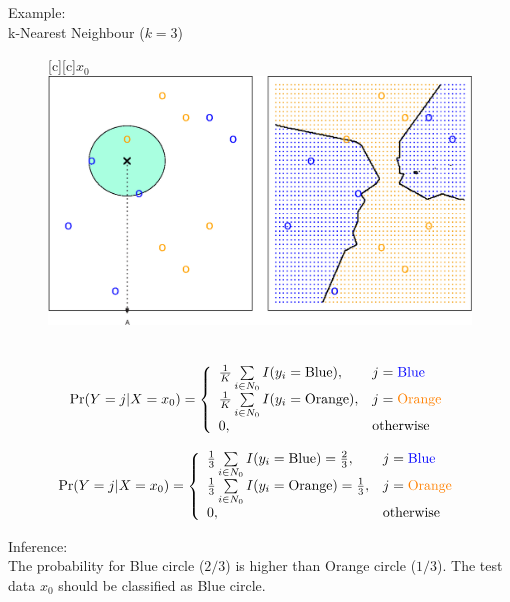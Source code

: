\documentclass[12pt,a4paper]{article}%
\theoremstyle{definition}
\theoremstyle{plain}
\numberwithin{equation}{section}
\begin{document}
\begin{framed}
Example: \\
k-Nearest Neighbour ($k=3$)

\begin{figure}[H]
\centering
{}[c][c]{$x_{0}$}
\includegraphics[scale=0.5]{images//2_14.eps}
\\~\\
\end{figure}

\begin{gather}
{\rm Pr}(Y=j|X=x_{0}) = \left\{
\begin{array}{ll}
\frac{1}{K}\sum\limits_{i \in N_{0}}I(y_{i}=\mbox{Blue}), & j = \mbox{\color{blue}Blue}\\
\frac{1}{K}\sum\limits_{i \in N_{0}}I(y_{i}=\mbox{Orange}), & j = \mbox{\color{orange}Orange}\\
0, & \mbox{otherwise}
\end{array} \right.
\end{gather}

\begin{gather}
{\rm Pr}(Y=j|X=x_{0}) = \left\{
\begin{array}{ll}
\frac{1}{3}\sum\limits_{i \in N_{0}}I(y_{i}=\mbox{Blue}) = \frac{2}{3}, & j = \mbox{\color{blue}Blue}\\
\frac{1}{3}\sum\limits_{i \in N_{0}}I(y_{i}=\mbox{Orange})= \frac{1}{3}, & j = \mbox{\color{orange}Orange}\\
0, & \mbox{otherwise} \\
\end{array} \right.
\end{gather}

Inference: \\
The probability for Blue circle ($2/3$) is higher than Orange circle ($1/3$). The test data $x_{0}$ should be classified as  Blue circle.

\end{framed}
\end{document}
